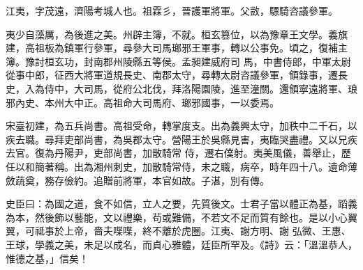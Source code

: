 \begin{pinyinscope}
 江夷，字茂遠，濟陽考城人也。祖霖彡，晉護軍將軍。父敳，驃騎咨議參軍。



 夷少自藻厲，為後進之美。州辟主簿，不就。桓玄篡位，以為豫章王文學。義旗建，高祖板為鎮軍行參軍，尋參大司馬瑯邪王軍事，轉以公事免。頃之，復補主簿。豫討桓玄功，封南郡州陵縣五等侯。孟昶建威府司
 馬，中書侍郎，中軍太尉從事中郎，征西大將軍道規長史、南郡太守，尋轉太尉咨議參軍，領錄事，遷長史，入為侍中，大司馬，從府公北伐，拜洛陽園陵，進至潼關。還領寧遠將軍、琅邪內史、本州大中正。高祖命大司馬府、瑯邪國事，一以委焉。



 宋臺初建，為五兵尚書。高祖受命，轉掌度支。出為義興太守，加秩中二千石，以疾去職。尋拜吏部尚書，為吳郡太守。營陽王於吳縣見害，夷臨哭盡禮。又以兄疾去官。復為丹陽尹，吏部尚書，加散騎常
 侍，遷右僕射。夷美風儀，善舉止，歷任以和簡著稱。出為湘州刺史，加散騎常侍，未之職，病卒，時年四十八。遺命薄斂蔬奠，務存儉約。追贈前將軍，本官如故。子湛，別有傳。



 史臣曰：為國之道，食不如信，立人之要，先質後文。士君子當以體正為基，蹈義為本，然後飾以藝能，文以禮樂，茍或難備，不若文不足而質有餘也。是以小心翼翼，可祗事於上帝，嗇夫喋喋，終不離於虎圈。江夷、謝方明、謝
 弘微、王惠、王球，學義之美，未足以成名，而貞心雅體，廷臣所罕及。《詩》云：「溫溫恭人，惟德之基，」信矣！



\end{pinyinscope}